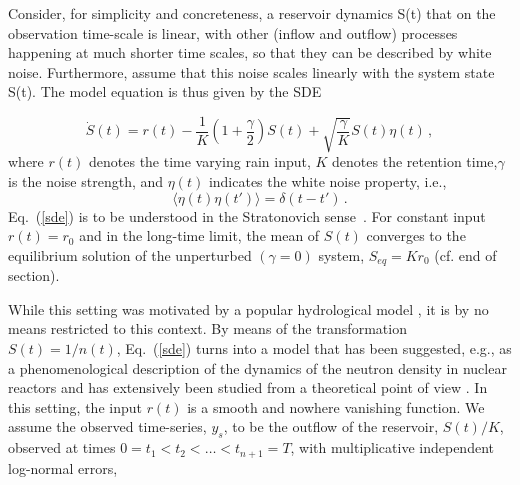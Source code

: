 \documentclass[11pt]{article}
\theoremstyle{definition}
\begin{document}
Consider, for simplicity and concreteness, a reservoir dynamics S(t) that on the observation time-scale is linear, with other (inflow and outflow) processes happening at much shorter time scales, so that they can be described by white noise. Furthermore, assume that this noise scales linearly with the system state S(t). The model equation is thus given by the SDE

\begin{equation}\label{sde}
\dot{S}(t) = r(t) - \frac{1}{K}\left(1+\frac{\gamma}{2}\right) S(t)
+
\sqrt{\frac{\gamma}{K}} S(t){\eta}(t)\,,
\end{equation}
where $r(t)$ denotes the time varying rain input, $K$ denotes the retention time,$\gamma$ is the noise strength, and $\eta(t)$ indicates the white noise property, i.e.,
\begin{equation}\label{whitenoise}
\langle\eta(t)\eta(t')\rangle = \delta(t-t')\,.
\end{equation}
Eq.~(\ref{sde}) is to be understood in the Stratonovich sense~\cite{stratonovich_1968}.
For constant input $r(t) = r_0$ and in the long-time limit, the mean of $S(t)$ converges to the equilibrium solution of the unperturbed $(\gamma = 0)$ system, $S_{eq} = Kr_{0}$ (cf. end of section).



While this setting was motivated by a popular hydrological model \cite{breinholt_2011_SDE, livina_2003_dischargeFluctuations}, it is by no means restricted to this context. By means of the transformation $S(t) = 1/n(t)$, Eq.~(\ref{sde}) turns into a model that has been suggested, e.g., as a phenomenological description of the dynamics of the neutron density in nuclear reactors \cite{dutre_1977_SDE} and has extensively been studied from a theoretical point of view \cite{schenzle_1979_multStochProc, fujisaka_1986_intermittency}.
In this setting, the input $r(t)$ is a smooth and nowhere vanishing function. We assume the observed time-series, $y_s$, to be the outflow of the reservoir, $S(t)/K$, observed at times $0=t_1<t_2<\dots < t_{n+1}=T$, with multiplicative independent log-normal errors,
\end{document}
